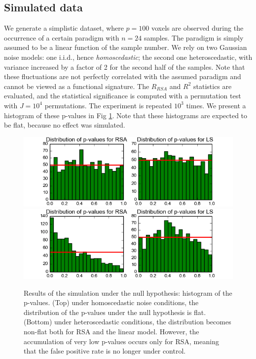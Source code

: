\documentclass{article}
\begin{document}
\subsection{Simulated data}
We generate a simplistic dataset, where $p=100$ voxels are observed
during the occurrence of a certain paradigm with $n=24$ samples. The
paradigm is simply assumed to be a linear function of the sample
number.
%
We rely on two Gaussian noise models: one i.i.d., hence %
\textit{homoscedastic}; the second one %
heteroscedastic, with
variance increased by a factor of 2 for the second half of the
samples.
%
Note that these fluctuations are not perfectly correlated with the
assumed paradigm and cannot be viewed as a functional signature.
% 
The $R_{RSA}$ and $R^2$ statistics are evaluated, and the
statistical significance is computed with a permutation test with
$J=10^4$ permutations. The experiment is repeated $10^3$ times. We
present a histogram of these p-values in Fig \ref{fig:sim}. Note that
these histograms are expected to be flat, because no effect was
simulated.

\begin{figure}[t]
\includegraphics[width=\linewidth]{figures/rsa_specificity_homo.png}
\includegraphics[width=\linewidth]{figures/rsa_specificity_hetero.png}
\caption{Results of the simulation under the null hypothesis:
  histogram of the p-values. (Top) under homoscedastic noise
  conditions, the distribution of the p-values under the null
  hypothesis is flat. (Bottom) under heteroscedastic conditions, the
  distribution becomes non-flat both for RSA and the linear
  model. However, the accumulation of very low p-values occurs only
  for RSA, meaning that the false positive rate is no longer under
  control.}
\label{fig:sim}
\end{figure}
\end{document}
